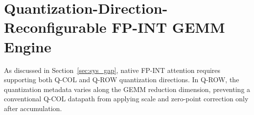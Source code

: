 \documentclass[sigconf,anonymous,nonacm]{acmart}
\newcommand{\ours}{\textsc{FINISH}}
\newcommand{\fpint}{FP-INT}
\newcommand{\qcol}{Q-COL}
\newcommand{\qrow}{Q-ROW}
\begin{document}

\section[Quantization-Direction-Reconfigurable FP-INT GEMM Engine]{Quantization-Direction-Reconfigurable \texorpdfstring{\fpint{}}{FP-INT} GEMM Engine}
\label{sec:fpint-gemm-engine}

As discussed in Section~\ref{sec:sys_gap}, native \fpint{} attention requires supporting both \qcol{} and \qrow{} quantization directions. In \qrow{}, the quantization metadata varies along the GEMM reduction dimension, preventing a conventional \qcol{} datapath from applying scale and zero-point correction only after accumulation.
\end{document}
